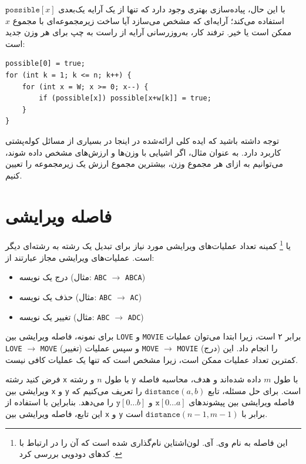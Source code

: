با این حال، پیاده‌سازی بهتری وجود دارد که تنها از یک آرایه یک‌بعدی $\texttt{possible}[x]$ استفاده می‌کند؛ آرایه‌ای که مشخص می‌سازد آیا ساخت زیرمجموعه‌ای با مجموع $x$ ممکن است یا خیر. ترفند کار، به‌روزرسانی آرایه از راست به چپ برای هر وزن جدید است:
\begin{lstlisting}
possible[0] = true;
for (int k = 1; k <= n; k++) {
    for (int x = W; x >= 0; x--) {
        if (possible[x]) possible[x+w[k]] = true;
    }
}
\end{lstlisting}

توجه داشته باشید که ایده کلی ارائه‌شده در اینجا در بسیاری از مسائل کوله‌پشتی کاربرد دارد. به عنوان مثال، اگر اشیایی با وزن‌ها و ارزش‌های مشخص داده شوند، می‌توانیم به ازای هر مجموع وزن، بیشترین مجموع ارزش یک زیرمجموعه را تعیین کنیم.

\section{فاصله ویرایشی}


 یا \footnote{این فاصله به نام وی. آی. لون‌اشتاین نام‌گذاری شده است که آن را در ارتباط با کدهای دودویی بررسی کرد \cite{lev66}.} کمینه تعداد عملیات‌های ویرایشی مورد نیاز برای تبدیل یک رشته به رشته‌ای دیگر است. عملیات‌های ویرایشی مجاز عبارتند از:
\begin{itemize}
\item درج یک نویسه (مثال: \texttt{ABC} $\rightarrow$ \texttt{ABCA})
\item حذف یک نویسه (مثال: \texttt{ABC} $\rightarrow$ \texttt{AC})
\item تغییر یک نویسه (مثال: \texttt{ABC} $\rightarrow$ \texttt{ADC})
\end{itemize}

برای نمونه، فاصله ویرایشی بین \texttt{LOVE} و \texttt{MOVIE} برابر ۲ است، زیرا ابتدا می‌توان عملیات \texttt{LOVE} $\rightarrow$ \texttt{MOVE} (تغییر) و سپس عملیات \texttt{MOVE} $\rightarrow$ \texttt{MOVIE} (درج) را انجام داد. این کمترین تعداد عملیات ممکن است، زیرا مشخص است که تنها یک عملیات کافی نیست.

فرض کنید رشته \texttt{x} با طول $n$ و رشته \texttt{y} با طول $m$ داده شده‌اند
و هدف، محاسبه فاصله ویرایشی بین \texttt{x} و \texttt{y} است.
برای حل مسئله، تابع $\texttt{distance}(a,b)$ را تعریف می‌کنیم
که فاصله ویرایشی بین پیشوندهای $\texttt{x}[0 \ldots a]$ و $\texttt{y}[0 \ldots b]$ را می‌دهد.
بنابراین با استفاده از این تابع، فاصله ویرایشی
بین \texttt{x} و \texttt{y} برابر با $\texttt{distance}(n-1,m-1)$ است.

